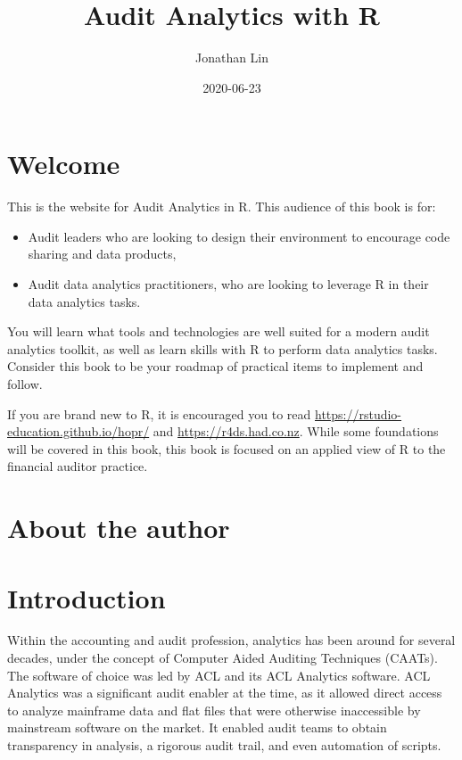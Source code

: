 \documentclass[
]{book}
\title{Audit Analytics with R}
\author{Jonathan Lin}
\date{2020-06-23}
\providecommand{\tightlist}{%
  \setlength{\itemsep}{0pt}\setlength{\parskip}{0pt}}
\begin{document}
\maketitle

{
\setcounter{tocdepth}{1}
\tableofcontents
}
\hypertarget{welcome}{%
\chapter*{Welcome}\label{welcome}}

This is the website for Audit Analytics in R. This audience of this book is for:

\begin{itemize}
\tightlist
\item
  Audit leaders who are looking to design their environment to encourage code sharing and data products,
\item
  Audit data analytics practitioners, who are looking to leverage R in their data analytics tasks.
\end{itemize}

You will learn what tools and technologies are well suited for a modern audit analytics toolkit, as well as learn skills with R to perform data analytics tasks. Consider this book to be your roadmap of practical items to implement and follow.

If you are brand new to R, it is encouraged you to read \url{https://rstudio-education.github.io/hopr/} and \url{https://r4ds.had.co.nz}. While some foundations will be covered in this book, this book is focused on an applied view of R to the financial auditor practice.

\hypertarget{about-the-author}{%
\chapter*{About the author}\label{about-the-author}}

\hypertarget{intro}{%
\chapter{Introduction}\label{intro}}

Within the accounting and audit profession, analytics has been around for several decades, under the concept of Computer Aided Auditing Techniques (CAATs). The software of choice was led by ACL and its ACL Analytics software. ACL Analytics was a significant audit enabler at the time, as it allowed direct access to analyze mainframe data and flat files that were otherwise inaccessible by mainstream software on the market. It enabled audit teams to obtain transparency in analysis, a rigorous audit trail, and even automation of scripts.
\end{document}
